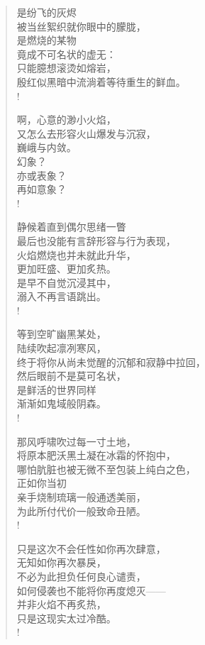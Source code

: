 \documentclass[UTF8, 12pt, a4paper]{ctexrep} %
\begin{document}
\begin{verse}
    是纷飞的灰烬\\
    被当丝絮织就你眼中的朦胧，\\
    是燃烧的某物\\
    竟成不可名状的虚无：\\
    只能臆想滚烫如熔岩，\\
    殷红似黑暗中流淌着等待重生的鲜血。\\!

    啊，心意的渺小火焰，\\
    又怎么去形容火山爆发与沉寂，\\
    巍峨与内敛。\\
    幻象？\\
    亦或表象？\\
    再如意象？\\!

    静候着直到偶尔思绪一瞥\\
    最后也没能有言辞形容与行为表现，\\
    火焰燃烧也并未就此升华，\\
    更加旺盛、更加炙热。\\
    是早不自觉沉浸其中，\\
    溺入不再言语跳出。\\!

    等到空旷幽黑某处，\\
    陆续吹起凛冽寒风，\\
    终于将你从尚未觉醒的沉郁和寂静中拉回，\\
    然后眼前不是莫可名状，\\
    是鲜活的世界同样\\
    渐渐如鬼域般阴森。\\!

    那风呼啸吹过每一寸土地，\\
    将原本肥沃黑土凝在冰霜的怀抱中，\\
    哪怕肮脏也被无微不至包装上纯白之色，\\
    正如你当初\\
    亲手烧制琉璃一般通透美丽，\\
    为此所付代价一般致命丑陋。\\!

    只是这次不会任性如你再次肆意，\\
    无知如你再次暴戾，\\
    不必为此担负任何良心谴责，\\
    如何侵袭也不能将你再度熄灭——\\
    并非火焰不再炙热，\\
    只是这现实太过冷酷。\\!


\end{verse}
\end{document}
